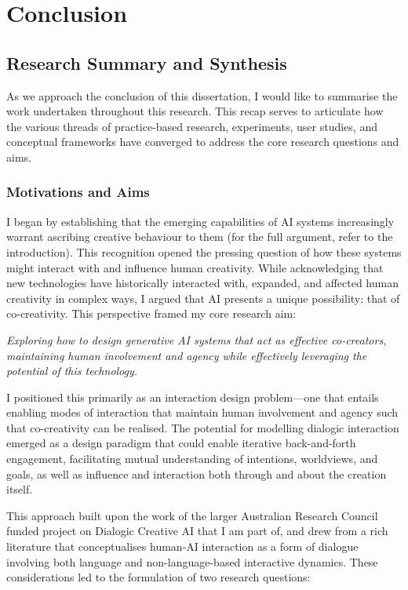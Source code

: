\chapter{Conclusion}\label{c:conclusion}


\section{Research Summary and Synthesis}

As we approach the conclusion of this dissertation, I would like to summarise the work undertaken throughout this research. This recap serves to articulate how the various threads of practice-based research, experiments, user studies, and conceptual frameworks have converged to address the core research questions and aims.

\subsection{Motivations and Aims}

I began by establishing that the emerging capabilities of AI systems increasingly warrant ascribing creative behaviour to them (for the full argument, refer to the introduction). This recognition opened the pressing question of how these systems might interact with and influence human creativity. While acknowledging that new technologies have historically interacted with, expanded, and affected human creativity in complex ways, I argued that AI presents a unique possibility: that of co-creativity. This perspective framed my core research aim:

\textit{Exploring how to design generative AI systems that act as effective co-creators, maintaining human involvement and agency while effectively leveraging the potential of this technology.}

I positioned this primarily as an interaction design problem—one that entails enabling modes of interaction that maintain human involvement and agency such that co-creativity can be realised. The potential for modelling dialogic interaction emerged as a design paradigm that could enable iterative back-and-forth engagement, facilitating mutual understanding of intentions, worldviews, and goals, as well as influence and interaction both through and about the creation itself.

This approach built upon the work of the larger Australian Research Council funded project on Dialogic Creative AI that I am part of, and drew from a rich literature that conceptualises human-AI interaction as a form of dialogue involving both language and non-language-based interactive dynamics. These considerations led to the formulation of two research questions:

